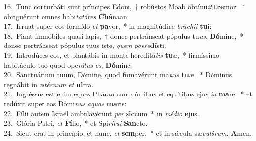 {16.~}Tunc conturbáti sunt príncipes Edom,~† robústos Moab obtínu\textit{it} \textbf{tre}mor:~* obriguérunt omnes habi\textit{ta}\textit{tó}\textit{res} \textbf{Chá}naan.\\
{17.~}Irruat super eos formído \textit{et} \textbf{pa}vor,~* in magnitúdine \textit{brá}\textit{chi}\textit{i} \textbf{tu}i:\\
{18.~}Fiant immóbiles quasi lapis,~† donec pertránseat pópulus tu\textit{us}, \textbf{Dó}mine,~* donec pertránseat pópulus tuus iste, \textit{quem} \textit{pos}\textit{se}\textbf{dí}sti.\\
{19.~}Introdúces eos, et plantábis in monte hereditá\textit{tis} \textbf{tu}æ,~* firmíssimo habitáculo tuo quod ope\textit{rá}\textit{tus} \textit{es}, \textbf{Dó}mine:\\
{20.~}Sanctuárium tuum, Dómine, quod firmavérunt ma\textit{nus} \textbf{tu}æ.~* Dóminus regnábit in æ\textit{tér}\textit{num} \textit{et} \textbf{ul}tra.\\
{21.~}Ingréssus est enim eques Phárao cum cúrribus et equítibus ejus \textit{in} \textbf{ma}re:~* et redúxit super eos Dómi\textit{nus} \textit{a}\textit{quas} \textbf{ma}ris:\\
{22.~}Fílii autem Israël ambulavérunt \textit{per} \textbf{sic}cum~* in \textit{mé}\textit{di}\textit{o} \textbf{e}jus.\\
{23.~}Glória Patri, \textit{et} \textbf{Fí}lio,~* et Spi\textit{rí}\textit{tu}\textit{i} \textbf{San}cto.\\
{24.~}Sicut erat in princípio, et nunc, \textit{et} \textbf{sem}per,~* et in sǽcula sæ\textit{cu}\textit{ló}\textit{rum}. \textbf{A}men.\\
